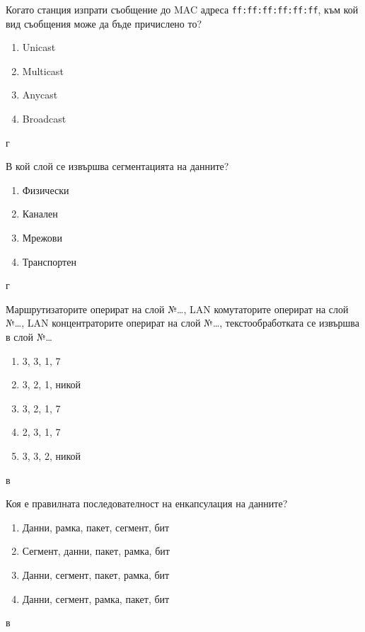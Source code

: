 \begin{q}
  Когато станция изпрати съобщение до MAC адреса \texttt{ff:ff:ff:ff:ff:ff},
  към кой вид съобщения може да бъде причислено то?

  \begin{enumerate}
  \item Unicast
  \item Multicast
  \item Anycast
  \item Broadcast
  \end{enumerate}

  \rans г
\end{q}

\begin{q}
  В кой слой се извършва сегментацията на данните?

  \begin{enumerate}
  \item Физически
  \item Канален
  \item Мрежови
  \item Транспортен
  \end{enumerate}

  \rans г
\end{q}

\begin{q}
  Маршрутизаторите оперират на слой №\dots, LAN комутаторите оперират на слой
  №\dots, LAN концентраторите оперират на слой №\dots, текстообработката се
  извършва в слой №\dots

  \begin{enumerate}
  \item 3, 3, 1, 7
  \item 3, 2, 1, никой
  \item 3, 2, 1, 7
  \item 2, 3, 1, 7
  \item 3, 3, 2, никой
  \end{enumerate}

  \rans в
\end{q}

\begin{q}
  Коя е правилната последователност на енкапсулация на данните?

  \begin{enumerate}
  \item Данни, рамка, пакет, сегмент, бит
  \item Сегмент, данни, пакет, рамка, бит
  \item Данни, сегмент, пакет, рамка, бит
  \item Данни, сегмент, рамка, пакет, бит
  \end{enumerate}

  \rans в
\end{q}

